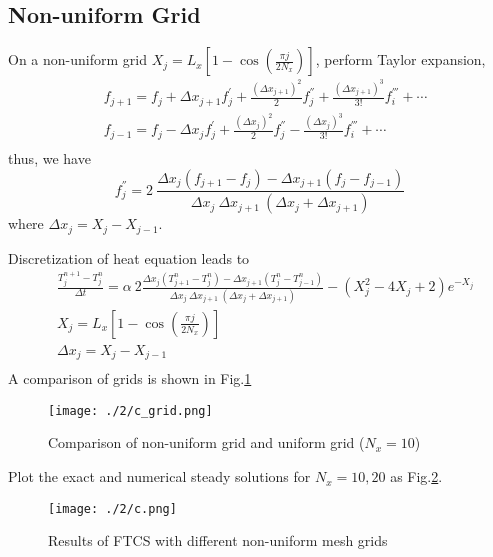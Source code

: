 \documentclass[12pt,a4paper]{article} %
\begin{document}
\begin{CJK}{UTF8}{song}
\subsection{Non-uniform Grid}
On a non-uniform grid $X_{j}=L_{x}[1-\cos(\frac{\pi j}{2N_{x}})]$, perform Taylor expansion,
\begin{equation}
    \begin{split}
& f_{j+1}=f_{j}+\Delta x_{j+1} f_{j}^{'}+\frac{(\Delta x_{j+1})^{2}}{2}f_{j}^{''}+\frac{(\Delta x_{j+1})^{3}}{3!}f_{i}^{'''} + \cdots \\
& f_{j-1}=f_{j}-\Delta x_{j} f_{j}^{'}+\frac{(\Delta x_{j})^{2}}{2}f_{j}^{''}-\frac{(\Delta x_{j})^{3}}{3!}f_{i}^{'''} + \cdots \\
    \end{split}
\end{equation}
thus, we have
\begin{equation}
f_{j}^{''}=2\ \frac{\Delta x_{j}(f_{j+1}-f_{j})-\Delta x_{j+1}(f_{j}-f_{j-1})}{\Delta x_{j} \ \Delta x_{j+1} \ (\Delta x_{j}+\Delta x_{j+1})}
\end{equation}
where $\Delta x_{j}=X_{j}-X_{j-1}$.

Discretization of heat equation leads to
\begin{equation}
\begin{split}
& \frac{T_{j}^{n+1}-T_{j}^{n}}{\Delta t}=\alpha \ 2 \frac{\Delta x_{j}(T_{j+1}^{n}-T_{j}^{n})-\Delta x_{j+1}(T_{j}^{n}-T_{j-1}^{n})}{\Delta x_{j} \ \Delta x_{j+1} \ (\Delta x_{j}+\Delta x_{j+1})}-(X_{j}^{2}-4X_{j}+2)e^{-X_{j}} \\
& X_{j}=L_{x}[1-\cos(\frac{\pi j}{2N_{x}})] \\
& \Delta x_{j}=X_{j}-X_{j-1} \\
\end{split}
\end{equation}
A comparison of grids is shown in Fig.\ref{Fig.2-cGrid}
\begin{figure}[htbp]
\centering
{
    \texttt{[image: ./2/c\_grid.png]}
}
\caption{Comparison of non-uniform grid and uniform grid ($N_{x}=10$)} \label{Fig.2-cGrid}
\end{figure}

Plot the exact and numerical steady solutions for $N_{x}=10,20$ as Fig.\ref{Fig.2-c}.

\begin{figure}[htbp]
\centering
{
    \texttt{[image: ./2/c.png]}
}
\caption{Results of FTCS with different non-uniform mesh grids} \label{Fig.2-c}
\end{figure}


\end{CJK}
\end{document}
